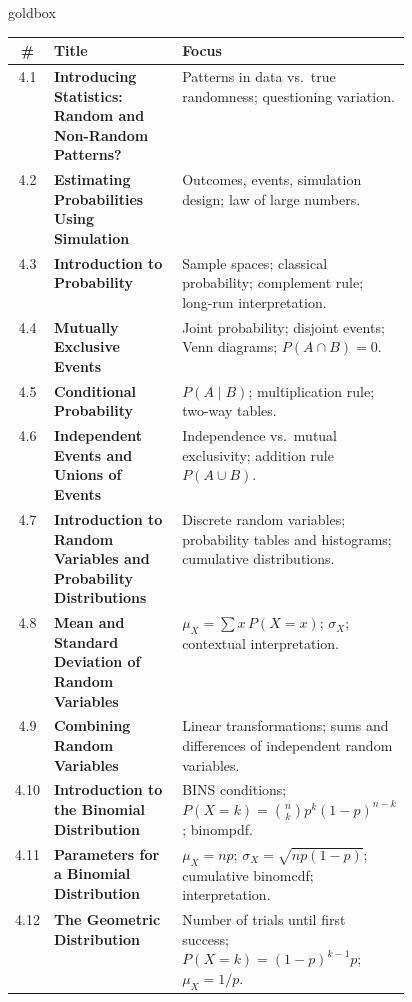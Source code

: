 \documentclass[10pt]{article}
\begin{document}
\renewcommand{\arraystretch}{1.6}
\begin{skillbox}{goldbox}
\begin{tabularx}{\linewidth}{@{} c >{\bfseries}p{0.46\linewidth} X @{}}
  \textbf{\#} & \textbf{Title} & \textbf{Focus} \\
  \hline
  4.1  & Introducing Statistics: Random and Non-Random Patterns?
       & Patterns in data vs.\ true randomness; questioning variation. \\
  \hline
  4.2  & Estimating Probabilities Using Simulation
       & Outcomes, events, simulation design; law of large numbers. \\
  \hline
  4.3  & Introduction to Probability
       & Sample spaces; classical probability; complement rule; long-run interpretation. \\
  \hline
  4.4  & Mutually Exclusive Events
       & Joint probability; disjoint events; Venn diagrams; $P(A \cap B) = 0$. \\
  \hline
  4.5  & Conditional Probability
       & $P(A\mid B)$; multiplication rule; two-way tables. \\
  \hline
  4.6  & Independent Events and Unions of Events
       & Independence vs.\ mutual exclusivity; addition rule $P(A \cup B)$. \\
  \hline
  4.7  & Introduction to Random Variables and Probability Distributions
       & Discrete random variables; probability tables and histograms; cumulative distributions. \\
  \hline
  4.8  & Mean and Standard Deviation of Random Variables
       & $\mu_X = \sum x\,P(X{=}x)$;\; $\sigma_X$; contextual interpretation. \\
  \hline
  4.9  & Combining Random Variables
       & Linear transformations; sums and differences of independent random variables. \\
  \hline
  4.10 & Introduction to the Binomial Distribution
       & BINS conditions; $P(X{=}k) = \binom{n}{k}p^k(1-p)^{n-k}$; binompdf. \\
  \hline
  4.11 & Parameters for a Binomial Distribution
       & $\mu_X = np$;\; $\sigma_X = \sqrt{np(1-p)}$;\; cumulative binomcdf; interpretation. \\
  \hline
  4.12 & The Geometric Distribution
       & Number of trials until first success; $P(X{=}k) = (1-p)^{k-1}p$;\; $\mu_X = 1/p$. \\
  \hline
\end{tabularx}
\end{skillbox}
\end{document}
